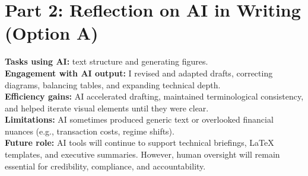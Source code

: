 \documentclass[12pt]{article}
\begin{document}
\newpage
\section*{Part 2: Reflection on AI in Writing (Option A)}
\textbf{Tasks using AI:} text structure and generating figures. \\
\textbf{Engagement with AI output:} I revised and adapted drafts, correcting diagrams, balancing tables, and expanding technical depth. \\
\textbf{Efficiency gains:} AI accelerated drafting, maintained terminological consistency, and helped iterate visual elements until they were clear. \\
\textbf{Limitations:} AI sometimes produced generic text or overlooked financial nuances (e.g., transaction costs, regime shifts). \\
\textbf{Future role:} AI tools will continue to support technical briefings, LaTeX templates, and executive summaries. However, human oversight will remain essential for credibility, compliance, and accountability.
\end{document}
